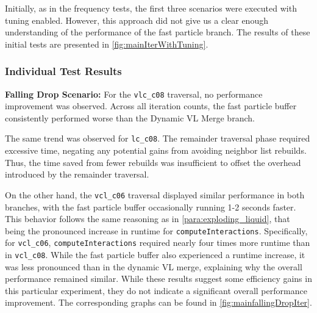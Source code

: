 Initially, as in the frequency tests, the first three scenarios were executed with tuning enabled. However, this approach did not give us a clear enough understanding of the performance of the fast particle branch. The results of these initial tests are presented in \ref{fig:mainIterWithTuning}.

\subsubsection{Individual Test Results}

\textbf{Falling Drop Scenario:}
For the \texttt{vlc\_c08} traversal, no performance improvement was observed. Across all iteration counts, the fast particle buffer consistently performed worse than the Dynamic VL Merge branch. 

The same trend was observed for \texttt{lc\_c08}. The remainder traversal phase required excessive time, negating any potential gains from avoiding neighbor list rebuilds. Thus, the time saved from fewer rebuilds was insufficient to offset the overhead introduced by the remainder traversal.


On the other hand, the \texttt{vcl\_c06} traversal displayed similar performance in both branches, with the fast particle buffer occasionally running 1-2 seconds faster. This behavior follows the same reasoning as in \ref{para:exploding_liquid}, that being the pronounced increase in runtime for \texttt{computeInteractions}. Specifically, for \texttt{vcl\_c06}, \texttt{computeInteractions} required nearly four times more runtime than in \texttt{vcl\_c08}. While the fast particle buffer also experienced a runtime increase, it was less pronounced than in the dynamic VL merge, explaining why the overall performance remained similar. While these results suggest some efficiency gains in this particular experiment, they do not indicate a significant overall performance improvement. The corresponding graphs can be found in \ref{fig:mainfallingDropIter}.

 

